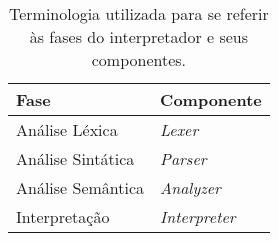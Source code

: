 \begin{table}[h]
	\centering
	\caption{Terminologia utilizada para se referir às fases do interpretador e seus componentes.}
	{
		\begin{tabular}{ll}
			\hline
			\textbf{Fase}          & \textbf{Componente} \\ \hline
			Análise Léxica      & \textit{Lexer}      \\
			Análise Sintática   & \textit{Parser}     \\
			Análise Semântica   & \textit{Analyzer}                   \\
			Interpretação       & \textit{Interpreter}                   \\ \hline
		\end{tabular}
	}
	\label{tab:terminologia_fases}
\end{table}
